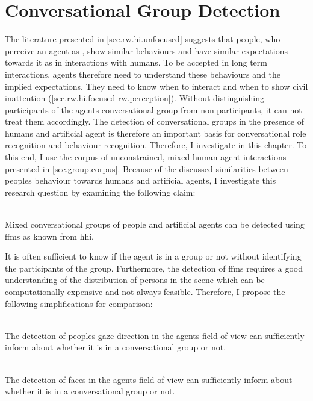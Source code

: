 \chapter{Conversational Group Detection}\label{ch.fformation}

The literature presented in \cref{sec.rw.hi.unfocused} suggests that people, who perceive an agent as , show similar behaviours and have similar expectations towards it as in interactions with humans.
To be accepted in long term interactions, agents therefore need to understand these behaviours and the implied expectations.
They need to know when to interact and when to show \gls{civil inattention} (\cref{sec.rw.hi.focused-rw.perception}).
Without distinguishing participants of the agents \gls{conversational group} from \glspl{non-participant}, it can not treat them accordingly. 
The detection of \glspl{conversational group} in the presence of humans and \gls{artificial agent} is therefore an important basis for \gls{conversational role} recognition and behaviour recognition.
Therefore, I investigate  in this chapter.
To this end, I use the corpus of unconstrained, mixed human-agent interactions presented in \cref{sec.group.corpus}. 
Because of the discussed similarities between peoples behaviour towards humans and \glspl{artificial agent}, I investigate this research question by examining the following claim: 
\newcommand{\hypffmone}{Mixed \glspl{conversational group} of people and \glspl{artificial agent} can be detected using \glspl{ffm} as known from \gls{hhi}.}
\begin{hyp3}
    \label{ffm.h1}
    \hspace{0pt}\\
    \hypffmone
\end{hyp3}
It is often sufficient to know if the agent is in a group or not without identifying the participants of the group. 
Furthermore, the detection of \glspl{ffm} requires a good understanding of the distribution of persons in the scene which can be computationally expensive and not always feasible.
Therefore, I propose the following simplifications for comparison:
\newcommand{\hypffmgaze}{The detection of peoples ga\-ze di\-rec\-tion in the agents field of view can sufficiently inform about whether it is in a \gls{conversational group} or not.}
\begin{hyp3}
    \label{ffm.gaze}
    \hspace{0pt}\\
    \hypffmgaze
\end{hyp3}
\newcommand{\hypffmface}{The detection of faces in the agents field of view can sufficiently inform about whether it is in a \gls{conversational group} or not.}
\begin{hyp3}
    \label{ffm.face}
    \hspace{0pt}\\
    \hypffmface
\end{hyp3}



